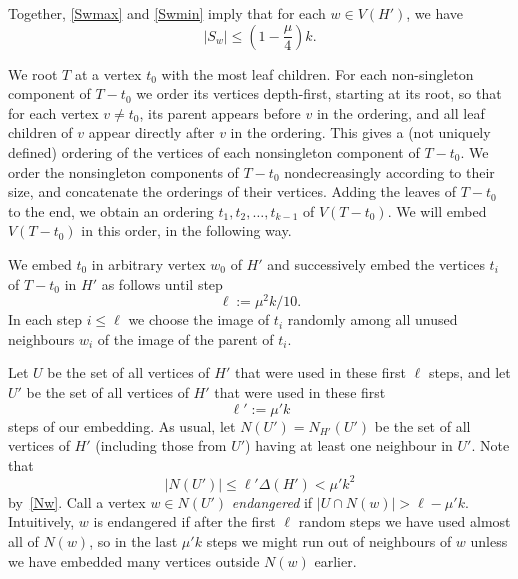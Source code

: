 \documentclass[12pt]{article}
\begin{document}
Together, \eqref{Swmax} and \eqref{Swmin} imply that for each $w \in V(H')$, we have
\begin{equation}\label{Swsmall}
   |S_w| \le (1-\frac{\mu}4)k. 
\end{equation}

We root $T$ at a  vertex  $t_0$  with the most leaf children. 
For each non-singleton component of $T-t_0$ we order its vertices depth-first, starting at its root, so that for each vertex $v\neq t_0$, its parent appears before $v$ in the ordering, and all  leaf children of $v$ appear directly after $v$ in the ordering.  This gives a (not uniquely defined) ordering of the vertices of each nonsingleton component of $T-t_0$. We order  the nonsingleton components of $T-t_0$ nondecreasingly according to their size, and concatenate the orderings of their vertices. Adding the leaves of $T-t_0$ to the end, we obtain an ordering $t_1, t_2, \ldots, t_{k-1}$ of   $V(T-t_0)$. 
We will embed $V(T-t_0)$ in this order, in the following way.

    
   We embed $t_0$ in arbitrary vertex $w_0$ of $H'$ and successively embed the vertices $t_i$ of $T-t_0$ in $H'$ as follows until step $$\ell:=\mu^2 k/10.$$ In each step $i\le\ell$ 
   we choose
    the image of $t_i$  randomly among all unused neighbours $w_i$ of the image of the parent of $t_i$. 
    

    
    Let  $U$ be the set of all vertices of $H'$ that were used in these first $\ell$ steps, and let $U'$ be the set of all vertices of $H'$ that were used in these first $$\ell':=\mu' k$$ steps of our embedding. As usual, let $N(U')=N_{H'}(U')$ be the set of all vertices of $H'$ (including those from $U'$) having at least one neighbour in $U'$. Note that 
    \begin{equation}\label{NU}
        |N(U')|\le \ell'\Delta(H')< \mu'k^2
    \end{equation}
     by~\eqref{Nw}.
  Call a vertex $w\in N(U')$ {\it endangered} if  $|U\cap N(w)|>\ell-\mu'k$.
Intuitively, $w$ is endangered if after the first $\ell$ random steps we have used almost all of $N(w)$,
so in the last $\mu'k$ steps we might run out of neighbours of $w$ unless we have embedded many vertices outside $N(w)$ earlier.
\end{document}
